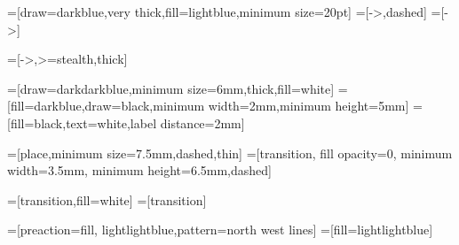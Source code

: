 
\usepackage{tikz}
\usetikzlibrary{shapes,automata,arrows,positioning,petri,patterns,fit,backgrounds,calc}

\tikzset{shorten >=1pt,node distance=3cm and 3cm,>=stealth',}

=[draw=darkblue,very thick,fill=lightblue,minimum size=20pt]
\tikzset{initial text=}
=[->,dashed]
=[->]


=[->,>=stealth,thick]

=[draw=darkdarkblue,minimum size=6mm,thick,fill=white]
 = [fill=darkblue,draw=black,minimum width=2mm,minimum height=5mm]
=[fill=black,text=white,label distance=2mm]

=[place,minimum size=7.5mm,dashed,thin]
=[transition, fill opacity=0, minimum width=3.5mm, minimum height=6.5mm,dashed]

=[transition,fill=white]
=[transition]

=[preaction={fill, lightlightblue},pattern=north west lines]
=[fill=lightlightblue]



\newcommand{\red}{\ensuremath{\mathit{red}}\xspace}
\newcommand{\green}{\ensuremath{\mathit{green}}\xspace}
\newcommand{\yellow}{\ensuremath{\mathit{yellow}}\xspace}
\newcommand{\yellowRed}{\ensuremath{\mathit{yellowRed}}\xspace}
\newcommand{\go}{\ensuremath{\mathit{go}}\xspace}
\renewcommand{\stop}{\ensuremath{\mathit{stop}}\xspace}
\newcommand{\getReady}{\ensuremath{\mathit{ready}}\xspace}
\newcommand{\prepareToStop}{\ensuremath{\mathit{ready}}\xspace}
\newcommand{\mustGoYellow}{\ensuremath{\mathit{reqYfromG}}\xspace}
\newcommand{\mustGoYellowRed}{\ensuremath{\mathit{reqYfromR}}\xspace}
\newcommand{\mustGoYellowBoth}{\ensuremath{\mathit{reqY}}\xspace}

\newcommand{\trafficlight}[5]{
  \begin{scope}[xshift=#4cm,yshift=#5cm,scale=0.74,transform shape]
    \draw [rounded corners=2pt,fill=gray!80,thick] (-.28,-.70) 
    rectangle (.28,.70);
    \draw [fill=#1] (0,.44) circle (6pt);
    \draw [fill=#2] (0,0) circle (6pt);
    \draw [fill=#3] (0,-.44) circle (6pt);
  \end{scope}}

